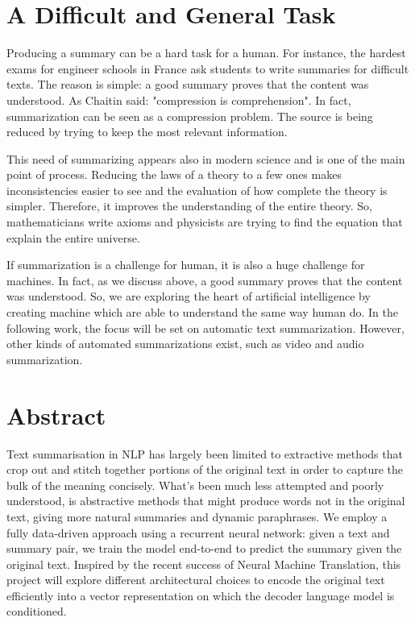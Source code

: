 \documentclass[11pt,a4paper,oldfontcommands]{memoir}
\begin{document}
\section{A Difficult and General Task}

Producing a summary can be a hard task for a human. For instance, the hardest exams for engineer schools in France ask students to write summaries for difficult texts. The reason is simple: a good summary proves that the content was understood. As Chaitin said: "compression is comprehension". In fact, summarization can be seen as a compression problem. The source is being reduced by trying to keep the most relevant information.

This need of summarizing appears also in modern science and is one of the main point of process. Reducing the laws of a theory to a few ones makes inconsistencies easier to see and the evaluation of how complete the theory is simpler. Therefore, it improves the understanding of the entire theory. So, mathematicians write axioms and physicists are trying to find the equation that explain the entire universe.

If summarization is a challenge for human, it is also a huge challenge for machines. In fact, as we discuss above, a good summary proves that the content was understood. So, we are exploring the heart of artificial intelligence by creating machine which are able to understand the same way human do.
In the following work, the focus will be set on automatic text summarization. However, other kinds of automated summarizations exist, such as video and audio summarization.

\section{Abstract}

Text summarisation in NLP has largely been limited to extractive methods that crop out and stitch together portions of the original text in order to capture the bulk of the meaning concisely. What's been much less attempted and poorly understood, is abstractive methods that might produce words not in the original text, giving more natural summaries and dynamic paraphrases. We employ a fully data-driven approach using a recurrent neural network: given a text and summary pair, we train the model end-to-end to predict the summary given the original text. Inspired by the recent success of Neural Machine Translation, this project will explore different architectural choices to encode the original text efficiently into a vector representation on which the decoder language model is conditioned.
\end{document}
